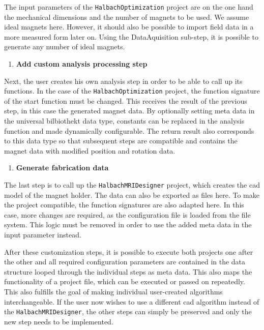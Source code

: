 The input parameters of the
\passthrough{\lstinline!HalbachOptimization!}\cite{HalbachOptimization}
project are on the one hand the mechanical dimensions and the number of
magnets to be used. We assume ideal magnets here. However, it should
also be possible to import field data in a more measured form later on.
Using the DataAquisition sub-step, it is possible to generate any number
of ideal magnets.

\begin{enumerate}
\def\labelenumi{\arabic{enumi}.}
\setcounter{enumi}{1}
\tightlist
\item
  \textbf{Add custom analysis processing step}
\end{enumerate}

Next, the user creates his own analysis step in order to be able to call
up its functions. In the case of the
\passthrough{\lstinline!HalbachOptimization!}\cite{HalbachOptimization}
project, the function signature of the start function must be changed.
This receives the result of the previous step, in this case the
generated magnet data. By optionally setting meta data in the universal
bilbiothekt data type, constants can be replaced in the analysis
function and made dynamically configurable. The return result also
corresponds to this data type so that subsequent steps are compatible
and contains the magnet data with modified position and rotation data.

\begin{enumerate}
\def\labelenumi{\arabic{enumi}.}
\setcounter{enumi}{2}
\tightlist
\item
  \textbf{Generate fabrication data}
\end{enumerate}

The last step is to call up the
\passthrough{\lstinline!HalbachMRIDesigner!}\cite{HalbachMRIDesigner}
project, which creates the \gls{cad} model of the magnet holder. The
data can also be exported as files here. To make the project compatible,
the function signatures are also adapted here. In this case, more
changes are required, as the configuration file is loaded from the file
system. This logic must be removed in order to use the added meta data
in the input parameter instead.

After these customization steps, it is possible to execute both projects
one after the other and all required configuration parameters are
contained in the data structure looped through the individual steps as
meta data. This also maps the functionality of a project file, which can
be executed or passed on repeatedly. This also fulfills the goal of
making individual user-created algorithms interchangeable. If the user
now wishes to use a different \gls{cad} algorithm instead of the
\passthrough{\lstinline!HalbachMRIDesigner!}\cite{HalbachMRIDesigner},
the other steps can simply be preserved and only the new step needs to
be implemented.


